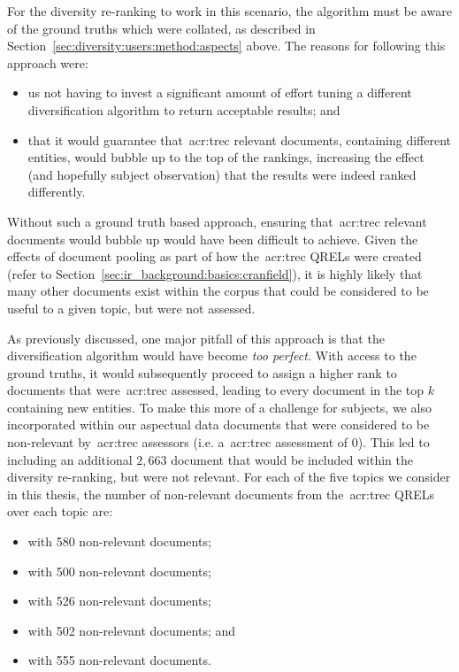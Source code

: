 For the diversity re-ranking to work in this scenario, the algorithm must be aware of the ground truths which were collated, as described in Section~\ref{sec:diversity:users:method:aspects} above. The reasons for following this approach were:

\begin{itemize}
    \item{us not having to invest a significant amount of effort tuning a different diversification algorithm to return acceptable results; and}
    \item{that it would guarantee that~\gls{acr:trec} relevant documents, containing different entities, would bubble up to the top of the rankings, increasing the effect (and hopefully subject observation) that the results were indeed ranked differently.}
\end{itemize}

Without such a ground truth based approach, ensuring that~\gls{acr:trec} relevant documents would bubble up would have been difficult to achieve. Given the effects of document pooling as part of how the~\gls{acr:trec} QRELs were created (refer to Section~\ref{sec:ir_background:basics:cranfield}), it is highly likely that many other documents exist within the corpus that could be considered to be useful to a given topic, but were not assessed.

As previously discussed, one major pitfall of this approach is that the diversification algorithm would have become \emph{too perfect.} With access to the ground truths, it would subsequently proceed to assign a higher rank to documents that were~\gls{acr:trec} assessed, leading to every document in the top $k$ containing new entities. To make this more of a challenge for subjects, we also incorporated within our aspectual data documents that were considered to be non-relevant by~\gls{acr:trec} assessors (i.e. a~\gls{acr:trec} assessment of $0$). This led to including an additional $2,663$ document that would be included within the diversity re-ranking, but were not relevant. For each of the five topics we consider in this thesis, the number of non-relevant documents from the~\gls{acr:trec} QRELs over each topic are:

\begin{itemize}
    \item{ with 580 non-relevant documents;}
    \item{ with 500 non-relevant documents;}
    \item{ with 526 non-relevant documents;}
    \item{ with 502 non-relevant documents; and}
    \item{ with 555 non-relevant documents.}
\end{itemize}

